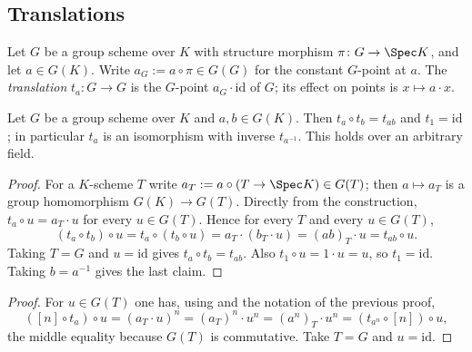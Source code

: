 \subsection{Translations}\label{sec:av-etale-translations}

\begin{construction}\label{def:av-translation}
Let $G$ be a group scheme over $K$ with structure morphism $\pi\colon G\to\Spec
K$, and let $a\in G(K)$.  Write $a_G:=a\circ\pi\in G(G)$ for the constant
$G$-point at $a$.  The \emph{translation} $t_a\colon G\to G$ is the $G$-point
$a_G\cdot\mathrm{id}$ of $G$; its effect on points is $x\mapsto a\cdot x$.
\end{construction}

\begin{lemma}\label{lem:av-translation}
Let $G$ be a group scheme over $K$ and $a,b\in G(K)$.  Then $t_a\circ
t_b=t_{ab}$ and $t_1=\mathrm{id}$; in particular $t_a$ is an isomorphism with
inverse $t_{a^{-1}}$.  This holds over an arbitrary field.
\end{lemma}
\begin{proof}
For a $K$-scheme $T$ write $a_T:=a\circ(T\to\Spec K)\in G(T)$; then
$a\mapsto a_T$ is a group homomorphism $G(K)\to G(T)$.  Directly from the
construction, $t_a\circ u=a_T\cdot u$ for every $u\in G(T)$.  Hence for every
$T$ and every $u\in G(T)$,
\[
  (t_a\circ t_b)\circ u=t_a\circ(t_b\circ u)=a_T\cdot(b_T\cdot u)
  =(ab)_T\cdot u=t_{ab}\circ u .
\]
Taking $T=G$ and $u=\mathrm{id}$ gives $t_a\circ t_b=t_{ab}$.  Also
$t_1\circ u=1\cdot u=u$, so $t_1=\mathrm{id}$.  Taking $b=a^{-1}$ gives the
last claim.
\end{proof}

\begin{proof}
For $u\in G(T)$ one has, using  and the notation of
the previous proof,
\[
  ([n]\circ t_a)\circ u=(a_T\cdot u)^n=(a_T)^n\cdot u^n=(a^n)_T\cdot u^n
  =(t_{a^n}\circ[n])\circ u,
\]
the middle equality because $G(T)$ is commutative.  Take $T=G$ and
$u=$.
\end{proof}

